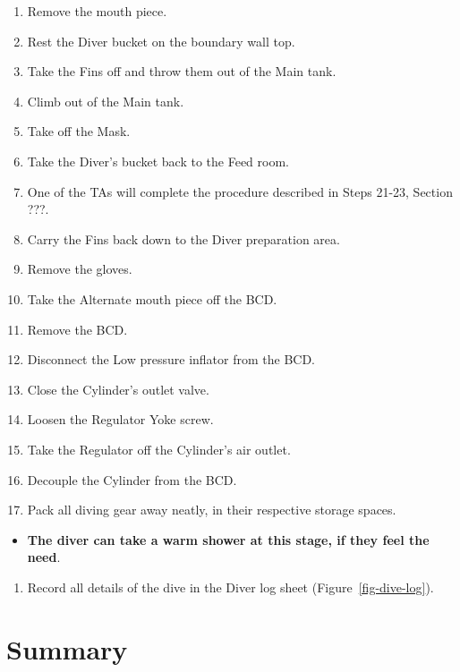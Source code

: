 \documentclass[
  letterpaper,
  DIV=11,
  numbers=noendperiod]{scrreprt}
\providecommand{\tightlist}{%
  \setlength{\itemsep}{0pt}\setlength{\parskip}{0pt}}\usepackage{longtable,booktabs,array}
\begin{document}
\begin{enumerate}
\def\labelenumi{\arabic{enumi}.}
\setcounter{enumi}{29}
\tightlist
\item
  Remove the mouth piece.
\item
  Rest the Diver bucket on the boundary wall top.
\item
  Take the Fins off and throw them out of the Main tank.
\item
  Climb out of the Main tank.
\item
  Take off the Mask.
\item
  Take the Diver's bucket back to the Feed room.
\item
  One of the TAs will complete the procedure described in Steps 21-23,
  Section ???.
\item
  Carry the Fins back down to the Diver preparation area.
\item
  Remove the gloves.
\item
  Take the Alternate mouth piece off the BCD.
\item
  Remove the BCD.
\item
  Disconnect the Low pressure inflator from the BCD.
\item
  Close the Cylinder's outlet valve.
\item
  Loosen the Regulator Yoke screw.
\item
  Take the Regulator off the Cylinder's air outlet.
\item
  Decouple the Cylinder from the BCD.
\item
  Pack all diving gear away neatly, in their respective storage spaces.
\end{enumerate}

\begin{itemize}
\tightlist
\item
  \textbf{The diver can take a warm shower at this stage, if they feel
  the need}.
\end{itemize}

\begin{enumerate}
\def\labelenumi{\arabic{enumi}.}
\setcounter{enumi}{45}
\tightlist
\item
  Record all details of the dive in the Diver log sheet
  (Figure~\ref{fig-dive-log}).
\end{enumerate}

\hypertarget{summary}{%
\chapter{Summary}\label{summary}}
\end{document}

